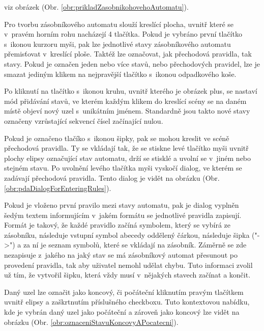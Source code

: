 viz obrázek (Obr. \ref{obr:prikladZasobnikohovehoAutomatu}). 


Pro tvorbu zásobníkového automatu slouží kreslící plocha, uvnitř které se v~pravém horním rohu nacházejí 4 tlačítka. Pokud je vybráno první tlačítko s~ikonou kurzoru myši, pak lze jednotlivé stavy zásobníkového automatu přemisťovat v~kreslící ploše. Taktéž lze označovat, jak přechodová pravidla, tak stavy. Pokud je označen jeden nebo více stavů, nebo přechodových pravidel, lze je smazat jediným klikem na nejpravější tlačítko s~ikonou odpadkového koše.

Po kliknutí na tlačítko s~ikonou kruhu, uvnitř kterého je obrázek plus, se nastaví mód přidávání stavů, ve kterém každým klikem do kreslící scény se na daném místě objeví nový uzel s~unikátním jménem. Standardně jsou takto nové stavy označeny vzrůstající sekvencí čísel začínající nulou.

Pokud je označeno tlačíko s~ikonou šipky, pak se mohou kreslit ve scéně přechodová pravidla. Ty se vkládají tak, že se stiskne levé tlačítko myši uvnitř plochy elipsy označující stav automatu, drží se stisklé a uvolní se v~jiném nebo stejném stavu. Po uvolnění levého tlačítka myši vyskočí dialog, ve kterém se zadávají přechodová pravidla. Tento dialog je vidět na obrázku (Obr. \ref{obr:pdaDialogForEnteringRules}). 


Pokud je vloženo první pravilo mezi stavy automatu, pak je dialog vyplněn šedým textem informujícím v~jakém formátu se jednotlivé pravidla zapisují.
Formát je takový, že každé pravidlo začíná symbolem, který se vybírá ze zásobníku, následuje vstupní symbol abecedy oddělený čárkou, následuje šipka ("->") a za ní je seznam symbolů, které se vkládají na zásobník. Záměrně se zde nezapisuje z~jakého na jaký stav se má zásobníkový automat přesunout po provedení pravidla, tak aby uživatel nemohl udělat chybu. Tuto informaci zvolil už tím, že vytvořil šipku, která vždy musí v~nějakých stavech začínat a končit.

Daný uzel lze označit jako koncový, či počáteční kliknutím pravým tlačítkem uvnitř elipsy a zaškrtnutím příslušného checkboxu. Tuto kontextovou nabídku, kde je vybrán daný uzel jako počáteční a zároveň jako koncový lze vidět na obrázku (Obr. \ref{obr:oznaceniStavuKoncovyAPocatecni}).

